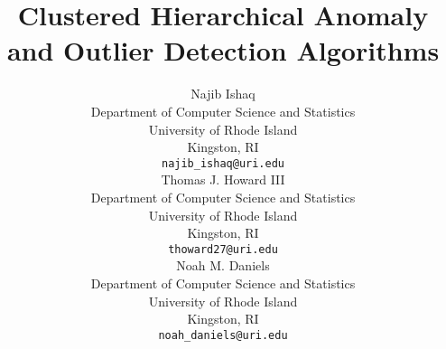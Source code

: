 \documentclass{article}
\begin{document}
  \title{Clustered Hierarchical Anomaly and Outlier Detection Algorithms}



\author{
    Najib Ishaq \\
    Department of Computer Science and Statistics\\
    University of Rhode Island\\
    Kingston, RI\\
    \texttt{najib\_ishaq@uri.edu} \\
    \And
    Thomas J. Howard III \\
    Department of Computer Science and Statistics\\
    University of Rhode Island\\
    Kingston, RI\\
    \texttt{thoward27@uri.edu} \\
    \AND
    Noah M. Daniels \\
    Department of Computer Science and Statistics\\
    University of Rhode Island\\
    Kingston, RI\\
    \texttt{noah\_daniels@uri.edu} \\
}
\end{document}

